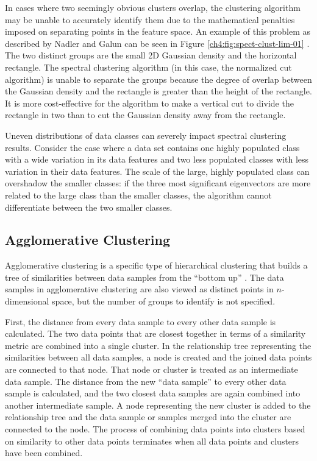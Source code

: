 In cases where two seemingly obvious clusters overlap, the clustering algorithm may be unable to accurately identify them due to the mathematical penalties imposed on separating points in the feature space. An example of this problem as described by Nadler and Galun can be seen in Figure \ref{ch4:fig:spect-clust-lim-01} \cite{Nadler2007}. The two distinct groups are the small 2D Gaussian density and the horizontal rectangle. The spectral clustering algorithm (in this case, the normalized cut algorithm) is unable to separate the groups because the degree of overlap between the Gaussian density and the rectangle is greater than the height of the rectangle. It is more cost-effective for the algorithm to make a vertical cut to divide the rectangle in two than to cut the Gaussian density away from the rectangle.

Uneven distributions of data classes can severely impact spectral clustering results. Consider the case where a data set contains one highly populated class with a wide variation in its data features and two less populated classes with less variation in their data features. The scale of the large, highly populated class can overshadow the smaller classes: if the three most significant eigenvectors are more related to the large class than the smaller classes, the algorithm cannot differentiate between the two smaller classes.

\subsection{Agglomerative Clustering}

Agglomerative clustering is a specific type of hierarchical clustering that builds a tree of similarities between data samples from the ``bottom up'' \cite{Ward1963}. The data samples in agglomerative clustering are also viewed as distinct points in $n$-dimensional space, but the number of groups to identify is not specified. 

First, the distance from every data sample to every other data sample is calculated. The two data points that are closest together in terms of a similarity metric are combined into a single cluster. In the relationship tree representing the similarities between all data samples, a node is created and the joined data points are connected to that node. That node or cluster is treated as an intermediate data sample. The distance from the new ``data sample'' to every other data sample is calculated, and the two closest data samples are again combined into another intermediate sample. A node representing the new cluster is added to the relationship tree and the data sample or samples merged into the cluster are connected to the node. The process of combining data points into clusters based on similarity to other data points terminates when all data points and clusters have been combined. 

